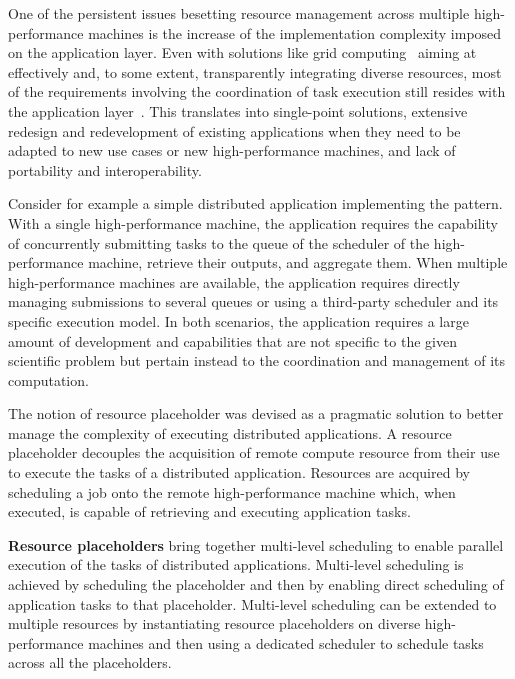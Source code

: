 \documentclass{sig-alternate}
\begin{document}

One of the persistent issues besetting resource management across multiple
high-performance machines is the increase of the implementation complexity
imposed on the application layer. Even with solutions like grid
computing~\cite{berman2003grid,foster2003grid} aiming at effectively and, to
some extent, transparently integrating diverse resources, most of the
requirements involving the coordination of task execution still resides with the
application layer~\cite{legrand2003,krauter2002,darema2005}. This translates
into single-point solutions, extensive redesign and redevelopment of existing
applications when they need to be adapted to new use cases or new
high-performance machines, and lack of portability and interoperability.

Consider for example a simple distributed application implementing the \MW
pattern. With a single high-performance machine, the application requires the
capability of concurrently submitting tasks to the queue of the scheduler of the
high-performance machine, retrieve their outputs, and aggregate them. When
multiple high-performance machines are available, the application requires
directly managing submissions to several queues or using a third-party scheduler
and its specific execution model. In both scenarios, the application requires a
large amount of development and capabilities that are not specific to the given
scientific problem but pertain instead to the coordination and management of its
computation.

The notion of resource placeholder was devised as a pragmatic solution to better
manage the complexity of executing distributed applications. A resource
placeholder decouples the acquisition of remote compute resource from their use
to execute the tasks of a distributed application. Resources are acquired by
scheduling a job onto the remote high-performance machine which, when executed,
is capable of retrieving and executing application tasks.


{\bf Resource placeholders} bring together mul\-ti-\-le\-vel sche\-du\-ling to
enable parallel execution of the tasks of distributed applications. Multi-level
scheduling is achieved by scheduling the placeholder and then by enabling direct
scheduling of application tasks to that placeholder. Mul\-ti-\-le\-vel
sche\-du\-ling can be extended to multiple resources by instantiating resource
placeholders on diverse high-performance machines and then using a dedicated
scheduler to schedule tasks across all the placeholders.
\end{document}
